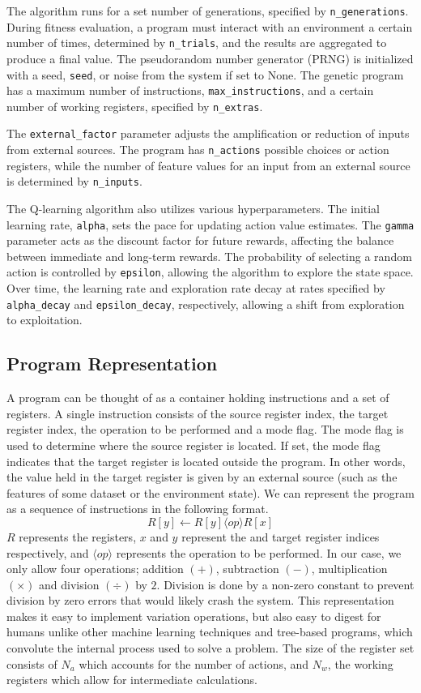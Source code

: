 \documentclass[12pt, final]{dalcsthesis}
\begin{document}
The algorithm runs for a set number of generations, specified by \texttt{n\_generations}. During fitness evaluation, a program must interact with an environment a certain number of times, determined by \texttt{n\_trials}, and the results are aggregated to produce a final value. The pseudorandom number generator (PRNG) is initialized with a seed, \texttt{seed}, or noise from the system if set to None. The genetic program has a maximum number of instructions, \texttt{max\_instructions}, and a certain number of working registers, specified by \texttt{n\_extras}.

The \texttt{external\_factor} parameter adjusts the amplification or reduction of inputs from external sources. The program has \texttt{n\_actions} possible choices or action registers, while the number of feature values for an input from an external source is determined by \texttt{n\_inputs}.

The Q-learning algorithm also utilizes various hyperparameters. The initial learning rate, \texttt{alpha}, sets the pace for updating action value estimates. The \texttt{gamma} parameter acts as the discount factor for future rewards, affecting the balance between immediate and long-term rewards. The probability of selecting a random action is controlled by \texttt{epsilon}, allowing the algorithm to explore the state space. Over time, the learning rate and exploration rate decay at rates specified by \texttt{alpha\_decay} and \texttt{epsilon\_decay}, respectively, allowing a shift from exploration to exploitation.

\subsection{Program Representation}
A program can be thought of as a container holding instructions and a set of registers. A single instruction consists of the source register index, the target register index, the operation to be performed and a mode flag. The mode flag is used to determine where the source register is located. If set, the mode flag indicates that the target register is located outside the program. In other words, the value held in the target register is given by an external source (such as the features of some dataset or the environment state). We can represent the program as a sequence of instructions in the following format. $$R[y] \leftarrow R[y] \langle op \rangle  R[x]$$ $R$ represents the registers, $x$ and $y$ represent the and target register indices respectively, and $\langle op \rangle$ represents the operation to be performed. In our case, we only allow four operations; addition $(+)$,
subtraction $(-)$, multiplication $(\times)$ and division $(\div)$ by $2$. Division is done by a non-zero constant to prevent division by zero errors that would likely crash the system. This representation makes it easy to implement variation operations, but also easy to digest for humans unlike other machine learning techniques and tree-based programs, which convolute the internal process used to solve a problem. The size of the register set consists of $N_a$ which accounts for the number of actions, and $N_w$, the working registers which allow for intermediate calculations.
\end{document}
